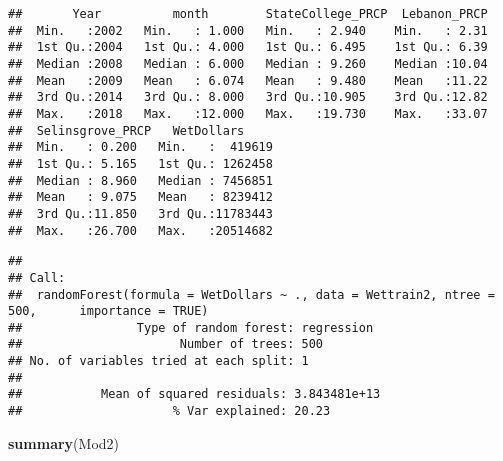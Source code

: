 \documentclass[]{article}
\newenvironment{Shaded}{\begin{snugshade}}{\end{snugshade}}
\newcommand{\KeywordTok}[1]{\textcolor[rgb]{0.13,0.29,0.53}{\textbf{{#1}}}}
\newcommand{\DataTypeTok}[1]{\textcolor[rgb]{0.13,0.29,0.53}{{#1}}}
\newcommand{\DecValTok}[1]{\textcolor[rgb]{0.00,0.00,0.81}{{#1}}}
\newcommand{\StringTok}[1]{\textcolor[rgb]{0.31,0.60,0.02}{{#1}}}
\newcommand{\CommentTok}[1]{\textcolor[rgb]{0.56,0.35,0.01}{\textit{{#1}}}}
\newcommand{\OtherTok}[1]{\textcolor[rgb]{0.56,0.35,0.01}{{#1}}}
\newcommand{\NormalTok}[1]{{#1}}
\begin{document}
\begin{verbatim}
##       Year          month        StateCollege_PRCP  Lebanon_PRCP  
##  Min.   :2002   Min.   : 1.000   Min.   : 2.940    Min.   : 2.31  
##  1st Qu.:2004   1st Qu.: 4.000   1st Qu.: 6.495    1st Qu.: 6.39  
##  Median :2008   Median : 6.000   Median : 9.260    Median :10.04  
##  Mean   :2009   Mean   : 6.074   Mean   : 9.480    Mean   :11.22  
##  3rd Qu.:2014   3rd Qu.: 8.000   3rd Qu.:10.905    3rd Qu.:12.82  
##  Max.   :2018   Max.   :12.000   Max.   :19.730    Max.   :33.07  
##  Selinsgrove_PRCP   WetDollars      
##  Min.   : 0.200   Min.   :  419619  
##  1st Qu.: 5.165   1st Qu.: 1262458  
##  Median : 8.960   Median : 7456851  
##  Mean   : 9.075   Mean   : 8239412  
##  3rd Qu.:11.850   3rd Qu.:11783443  
##  Max.   :26.700   Max.   :20514682
\end{verbatim}

\begin{Shaded}
\end{Shaded}

\begin{verbatim}
## 
## Call:
##  randomForest(formula = WetDollars ~ ., data = Wettrain2, ntree = 500,      importance = TRUE) 
##                Type of random forest: regression
##                      Number of trees: 500
## No. of variables tried at each split: 1
## 
##           Mean of squared residuals: 3.843481e+13
##                     % Var explained: 20.23
\end{verbatim}

\begin{Shaded}
\begin{Highlighting}[]
\KeywordTok{summary}\NormalTok{(Mod2)}
\end{Highlighting}
\end{Shaded}
\end{document}
